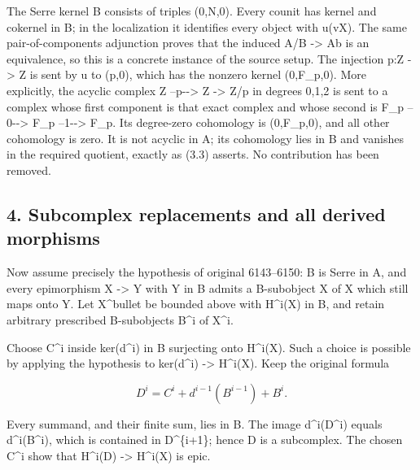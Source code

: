 The Serre kernel B consists of triples (0,\allowbreak{}N,\allowbreak{}0)\allowbreak{}. Every counit has kernel and cokernel in B; in the localization it identifies every object with u(vX)\allowbreak{}. The same pair-of-components adjunction proves that the induced A/\allowbreak{}B \allowbreak{}-> Ab is an equivalence,\allowbreak{} so this is a concrete instance of the source setup. The injection p:\allowbreak{}Z \allowbreak{}-> Z is sent by u to (p,\allowbreak{}0)\allowbreak{},\allowbreak{} which has the nonzero kernel (0,\allowbreak{}F\_\allowbreak{}p,\allowbreak{}0)\allowbreak{}. More explicitly,\allowbreak{} the acyclic complex Z --p-\allowbreak{}-> Z \allowbreak{}-> Z/\allowbreak{}p in degrees 0,\allowbreak{}1,\allowbreak{}2 is sent to a complex whose first component is that exact complex and whose second is F\_\allowbreak{}p --0-\allowbreak{}-> F\_\allowbreak{}p --1-\allowbreak{}-> F\_\allowbreak{}p. Its degree-zero cohomology is (0,\allowbreak{}F\_\allowbreak{}p,\allowbreak{}0)\allowbreak{},\allowbreak{} and all other cohomology is zero. It is not acyclic in A; its cohomology lies in B and vanishes in the required quotient,\allowbreak{} exactly as (3.3)\allowbreak{} asserts. No contribution has been removed.

\subsection{4. Subcomplex replacements and all derived morphisms}\label{proofs-5910-6199-subcomplex-replacements-and-all-derived-morphisms}

Now assume precisely the hypothesis of original 6143–\allowbreak{}6150:\allowbreak{} B is Serre in A,\allowbreak{} and every epimorphism X \allowbreak{}-> Y with Y in B admits a B-subobject X\textquotesingle{} of X which still maps onto Y. Let X\^{}bullet be bounded above with H\textasciicircum{}i(X)\allowbreak{} in B,\allowbreak{} and retain arbitrary prescribed B-subobjects B\^{}i of X\^{}i.

Choose C\^{}i inside ker(d\textasciicircum{}i)\allowbreak{} in B surjecting onto H\textasciicircum{}i(X)\allowbreak{}. Such a choice is possible by applying the hypothesis to ker(d\textasciicircum{}i)\allowbreak{} \allowbreak{}-> H\textasciicircum{}i(X)\allowbreak{}. Keep the original formula

\[
 D^i=C^i+d^{i-1}(B^{i-1})+B^i.                           \tag{4.1}
\]

Every summand,\allowbreak{} and their finite sum,\allowbreak{} lies in B. The image d\textasciicircum{}i(D\textasciicircum{}i)\allowbreak{} equals d\textasciicircum{}i(B\textasciicircum{}i)\allowbreak{},\allowbreak{} which is contained in D\textasciicircum{}\{i\allowbreak{}+1\}; hence D is a subcomplex. The chosen C\^{}i show that H\textasciicircum{}i(D)\allowbreak{} \allowbreak{}-> H\textasciicircum{}i(X)\allowbreak{} is epic.


